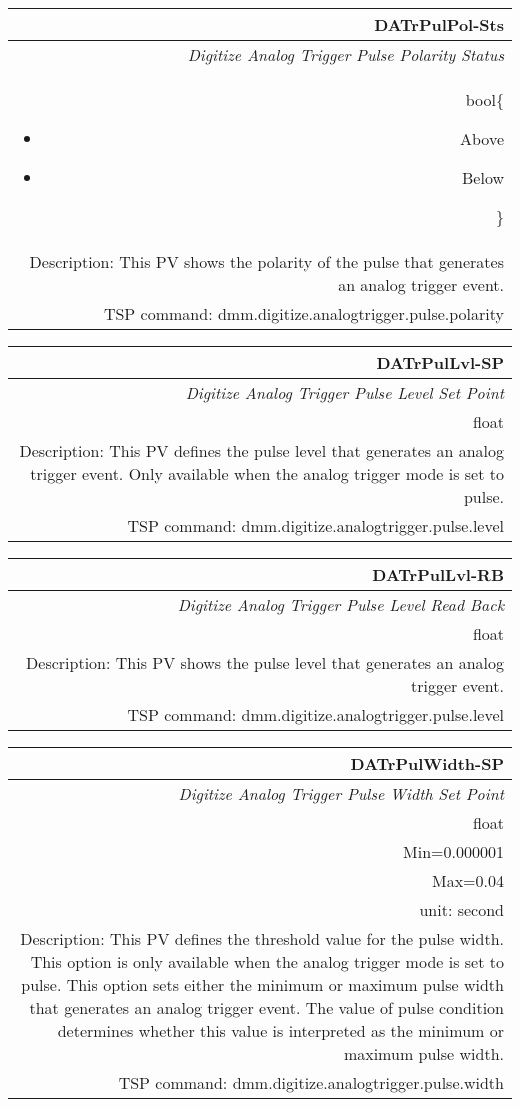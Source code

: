 \documentclass[openany]{article}
\begin{document}
		\begin{tabular}{N}
			\hline
			\bfseries DATrPulPol-Sts\label{pv:datrpulpol-sts} \\ \hline
			\emph{Digitize Analog Trigger Pulse Polarity Status} \\
			bool\{\begin{itemize}[noitemsep]
				\small
				\item[] Above
				\item[] Below
			\end{itemize}\} \\
			Description: This PV shows the polarity of the pulse that generates an analog trigger event. \\
			TSP command: dmm.digitize.analogtrigger.pulse.polarity
		\end{tabular}

		\begin{tabular}{N}
			\hline
			\bfseries DATrPulLvl-SP\label{pv:datrpullvl-sp} \\ \hline
			\emph{Digitize Analog Trigger Pulse Level Set Point} \\
			float \\
			Description: This PV defines the pulse level that generates an analog trigger event. Only available when the analog trigger mode is set to pulse. \\
			TSP command: dmm.digitize.analogtrigger.pulse.level \\
		\end{tabular}

		\begin{tabular}{N}
			\hline
			\bfseries DATrPulLvl-RB\label{pv:datrpullvl-rb} \\ \hline
			\emph{Digitize Analog Trigger Pulse Level Read Back} \\
			float \\
			Description: This PV shows the pulse level that generates an analog trigger event. \\
			TSP command: dmm.digitize.analogtrigger.pulse.level
		\end{tabular}

		\begin{tabular}{N}
			\hline
			\bfseries DATrPulWidth-SP\label{pv:datrpulwidth-sp} \\ \hline
			\emph{Digitize Analog Trigger Pulse Width Set Point} \\
			float \\
			Min=0.000001 \\
			Max=0.04 \\
			unit: second \\
			Description: This PV defines the threshold value for the pulse width. This option is only available when the analog trigger mode is set to pulse. This option sets either the minimum or maximum pulse width that generates an analog trigger event. The value of pulse condition determines whether this value is interpreted as the minimum or maximum pulse width. \\
			TSP command: dmm.digitize.analogtrigger.pulse.width
		\end{tabular}
\end{document}
